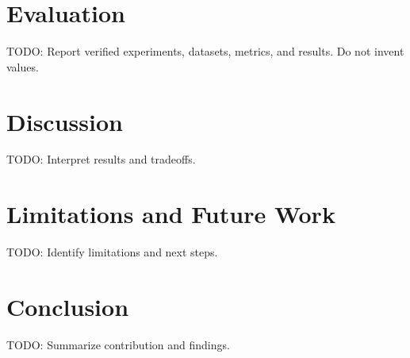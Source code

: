 \documentclass[conference]{IEEEtran}
\begin{document}
\section{Evaluation}
TODO: Report verified experiments, datasets, metrics, and results. Do not invent values.

\section{Discussion}
TODO: Interpret results and tradeoffs.

\section{Limitations and Future Work}
TODO: Identify limitations and next steps.

\section{Conclusion}
TODO: Summarize contribution and findings.



\end{document}

